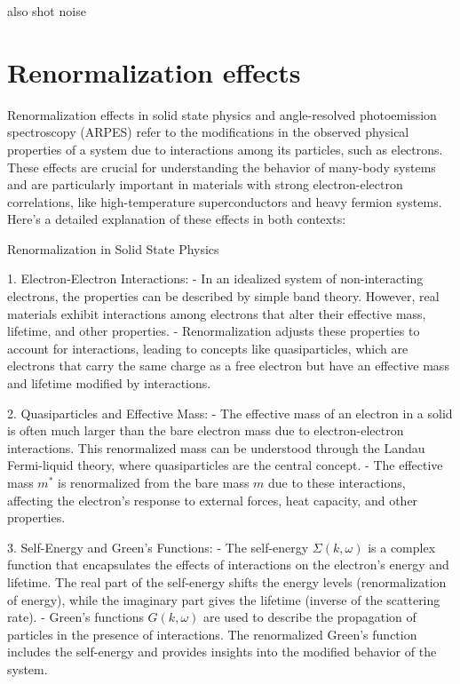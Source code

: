also shot noise \href{https://en.wikipedia.org/wiki/Shot_noise}{}

\section{Renormalization effects}
Renormalization effects in solid state physics and angle-resolved photoemission spectroscopy (ARPES) refer to the modifications in the observed physical properties of a system due to interactions among its particles, such as electrons. These effects are crucial for understanding the behavior of many-body systems and are particularly important in materials with strong electron-electron correlations, like high-temperature superconductors and heavy fermion systems. Here’s a detailed explanation of these effects in both contexts:

Renormalization in Solid State Physics

1. Electron-Electron Interactions:
- In an idealized system of non-interacting electrons, the properties can be described by simple band theory. However, real materials exhibit interactions among electrons that alter their effective mass, lifetime, and other properties.
- Renormalization adjusts these properties to account for interactions, leading to concepts like quasiparticles, which are electrons that carry the same charge as a free electron but have an effective mass and lifetime modified by interactions.

2. Quasiparticles and Effective Mass:
- The effective mass of an electron in a solid is often much larger than the bare electron mass due to electron-electron interactions. This renormalized mass can be understood through the Landau Fermi-liquid theory, where quasiparticles are the central concept.
- The effective mass \(m^*\) is renormalized from the bare mass \(m\) due to these interactions, affecting the electron’s response to external forces, heat capacity, and other properties.

3. Self-Energy and Green's Functions:
- The self-energy \(\Sigma(k, \omega)\) is a complex function that encapsulates the effects of interactions on the electron’s energy and lifetime. The real part of the self-energy shifts the energy levels (renormalization of energy), while the imaginary part gives the lifetime (inverse of the scattering rate).
- Green’s functions \(G(k, \omega)\) are used to describe the propagation of particles in the presence of interactions. The renormalized Green’s function includes the self-energy and provides insights into the modified behavior of the system.

